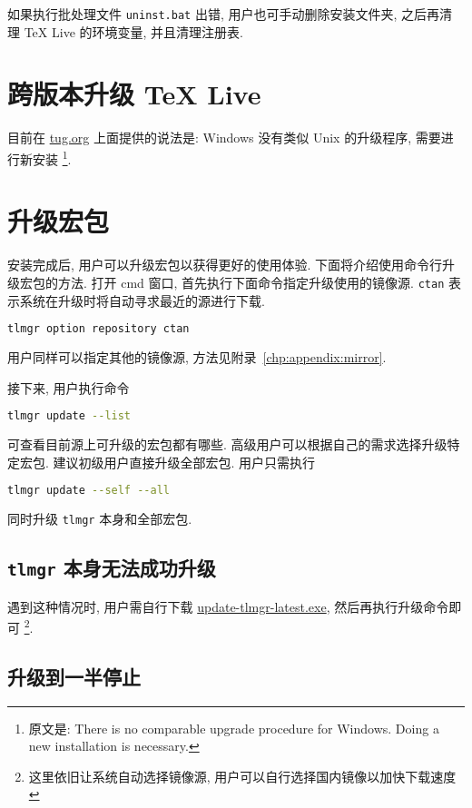 如果执行批处理文件 \texttt{uninst.bat} 出错,
用户也可手动删除安装文件夹,
之后再清理 \TeX{} Live 的环境变量,
并且清理注册表.

\section{跨版本升级 \TeX{} Live}

目前在 \href{https://www.tug.org/texlive/upgrade.html}{tug.org}
上面提供的说法是:
Windows 没有类似 Unix 的升级程序,
需要进行新安装%
\footnote{原文是: There is no comparable upgrade procedure for Windows.
Doing a new installation is necessary.}.

\section{升级宏包}\label{sec:windows:update}

安装完成后, 用户可以升级宏包以获得更好的使用体验. 
下面将介绍使用命令行升级宏包的方法. 
打开 \textsf{cmd} 窗口, 首先执行下面命令指定升级使用的镜像源. 
\texttt{ctan} 表示系统在升级时将自动寻求最近的源进行下载. 
\begin{lstlisting}[language=bash]
  tlmgr option repository ctan
\end{lstlisting}
用户同样可以指定其他的镜像源,
方法见附录~\ref{chp:appendix:mirror}.

接下来, 用户执行命令
\begin{lstlisting}[language=bash]
  tlmgr update --list
\end{lstlisting}
可查看目前源上可升级的宏包都有哪些. 
高级用户可以根据自己的需求选择升级特定宏包.
建议初级用户直接升级全部宏包. 
用户只需执行
\begin{lstlisting}[language=bash]
  tlmgr update --self --all
\end{lstlisting}
同时升级 \texttt{tlmgr} 本身和全部宏包. 

\subsection{\texttt{tlmgr} 本身无法成功升级}

遇到这种情况时, 用户需自行下载
\href{https://mirrors.ctan.org/systems/texlive/tlnet/update-tlmgr-latest.exe}{update-tlmgr-latest.exe},
然后再执行升级命令即可%
\footnote{这里依旧让系统自动选择镜像源,
用户可以自行选择国内镜像以加快下载速度}. 

\subsection{升级到一半停止}

